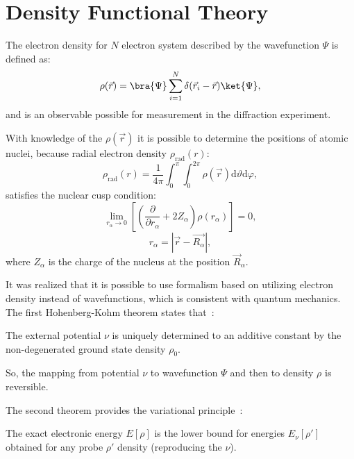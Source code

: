 \section{Density Functional Theory}

The electron density for $N$ electron system described by the wavefunction $\Psi$ is defined as:
\begin{equation}
    \rho(\vec{r}) = \bra{\Psi} \sum_{i = 1}^{N} \delta(\vec{r}_i - \vec{r}) \ket{\Psi},
\end{equation}
and is an observable possible for measurement in the diffraction experiment.

With knowledge of the $\rho(\vec{r})$ it is possible to determine the positions of atomic nuclei, because radial electron density $\rho_{\text{rad}}(r)$:
\begin{equation}
    \rho_{\text{rad}}(r) = \frac{1}{4\pi} \int_0^{\pi} \int_0^{2\pi} \rho(\vec{r}) \text{d}\vartheta\text{d}\varphi,
\end{equation}
satisfies the nuclear cusp condition:
\begin{equation}
    \lim_{r_{\alpha} \rightarrow 0} \left[ \left( \frac{\partial}{\partial r_{\alpha}} + 2 Z_{\alpha} \right) \rho(r_{\alpha}) \right] = 0,
\end{equation}
\begin{equation}
    r_{\alpha} = \left| \vec{r} - \vec{R_{\alpha}} \right|,
\end{equation}
where $Z_{\alpha}$ is the charge of the nucleus at the position $\vec{R}_{\alpha}$.

It was realized that it is possible to use formalism based on utilizing electron density instead of wavefunctions, which is consistent with quantum mechanics. The first Hohenberg-Kohm theorem states that~\cite{dft}:
\begin{theorem}
    The external potential $\nu$ is uniquely determined to an additive constant by the non-degenerated ground state density $\rho_0$.
\end{theorem}

So, the mapping from potential $\nu$ to wavefunction $\Psi$ and then to density $\rho$ is reversible.

The second theorem provides the variational principle~\cite{dft}:
\begin{theorem}
    The exact electronic energy $E[\rho]$ is the lower bound for energies $E_{\nu}[\rho']$ obtained for any probe $\rho'$ density (reproducing the $\nu$).
\end{theorem}

